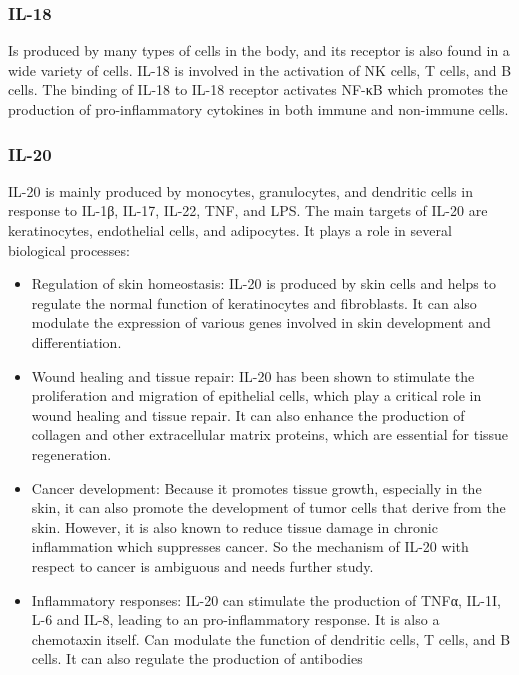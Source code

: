 \subsubsection{IL-18}
\label{in:IL18}

Is produced by many types of cells in the body, and its receptor is also found in a wide variety of cells. IL-18 is involved in the activation of NK cells, T cells, and B cells. The binding of IL-18 to IL-18 receptor activates NF-κB which promotes the production of pro-inflammatory cytokines in both immune and non-immune cells.


\subsubsection{IL-20}
\label{in:IL20}

IL-20 is mainly produced by monocytes, granulocytes, and dendritic cells in response to IL-1β, IL-17, IL-22, TNF, and LPS. The main targets of IL-20 are keratinocytes, endothelial cells, and adipocytes. It plays a role in several biological processes:

\begin{itemize}

    \item Regulation of skin homeostasis: IL-20 is produced by skin cells and helps to regulate the normal function of keratinocytes and fibroblasts. It can also modulate the expression of various genes involved in skin development and differentiation.
    
    \item Wound healing and tissue repair: IL-20 has been shown to stimulate the proliferation and migration of epithelial cells, which play a critical role in wound healing and tissue repair. It can also enhance the production of collagen and other extracellular matrix proteins, which are essential for tissue regeneration.
    
    \item Cancer development: Because it promotes tissue growth, especially in the skin, it can also promote the development of tumor cells that derive from the skin. However, it is also known to reduce tissue damage in chronic inflammation which suppresses cancer. So the mechanism of IL-20 with respect to cancer is ambiguous and needs further study.
    
    \item Inflammatory responses: IL-20 can stimulate the production of TNFα, IL-1I, L-6 and IL-8, leading to an pro-inflammatory response. It is also a chemotaxin itself. Can modulate the function of dendritic cells, T cells, and B cells. It can also regulate the production of antibodies
    
\end{itemize}






